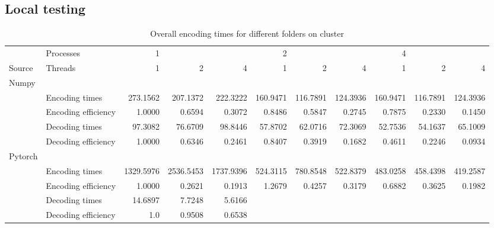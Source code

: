 \subsection{Local testing}
\begin{table}[!h]
	\caption{Overall encoding times for different folders on cluster }
	\begin{tabular}{llrrr|rrr|rrr}
		\toprule
		\diagbox{}{} & Processes  &     1 &&&        2&& &        4&& \\
		Source & Threads   & 1 & 2 & 4 & 1 & 2 & 4 & 1 & 2 & 4\\
		\toprule
		Numpy & &  & \\
		\toprule
		& Encoding times &  273.1562 &  207.1372 &  222.3222  &  160.9471 &  116.7891 &  124.3936  &  160.9471 &  116.7891 &  124.3936  \\
		\midrule
		& Encoding efficiency &  1.0000 &  0.6594 &  0.3072 & 0.8486 &  0.5847 &  0.2745 &  0.7875 &  0.2330 &  0.1450\\
		\midrule
		& Decoding times & 97.3082 &  76.6709 &  98.8446 &  57.8702 &  62.0716 &  72.3069 &   52.7536 &  54.1637 &  65.1009 \\
		\midrule
		& Decoding efficiency & 1.0000 &  0.6346 &  0.2461 &  0.8407 &  0.3919 &  0.1682 &  0.4611 &  0.2246 &  0.0934  \\
		\toprule
		Pytorch  & &  & \\
		\toprule
		& Encoding times &   1329.5976 &  2536.5453 &  1737.9396  &   524.3115 &   780.8548 &   522.8379 & 483.0258 &   458.4398 &   419.2587\\
		\midrule
		& Encoding efficiency  &  1.0000 &  0.2621 &  0.1913  &  1.2679 &  0.4257 &  0.3179 &  0.6882 &  0.3625 &  0.1982 \\
		\midrule
		& Decoding times  & 14.6897 &  7.7248 &  5.6166 \\
		\midrule
		& Decoding efficiency&  1.0 &  0.9508 &  0.6538 \\
		\bottomrule
	\end{tabular}
\end{table}
